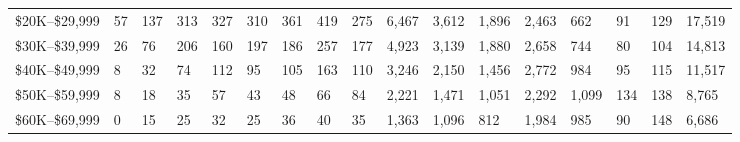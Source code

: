 \documentclass{article}
\begin{document}
\begin{landscape}
\begin{table}[h]
\begin{tabular}{|l|lllllllllllllll|l|}
\$20K--\$29,999 & 57                                         & 137                                 & 313                                & 327                                & 310                              & 361                               & 419                               & 275                               & 6,467                            & 3,612                                 & 1,896                            & 2,463                            & 662                              & 91                                  & 129          & 17,519  \\ \cline{1-1} \cline{17-17} 
\$30K--\$39,999 & 26                                         & 76                                  & 206                                & 160                                & 197                              & 186                               & 257                               & 177                               & 4,923                            & 3,139                                 & 1,880                            & 2,658                            & 744                              & 80                                  & 104          & 14,813  \\ \cline{1-1} \cline{17-17} 
\$40K--\$49,999 & 8                                          & 32                                  & 74                                 & 112                                & 95                               & 105                               & 163                               & 110                               & 3,246                            & 2,150                                 & 1,456                            & 2,772                            & 984                              & 95                                  & 115          & 11,517  \\ \cline{1-1} \cline{17-17} 
\$50K--\$59,999 & 8                                          & 18                                  & 35                                 & 57                                 & 43                               & 48                                & 66                                & 84                                & 2,221                            & 1,471                                 & 1,051                            & 2,292                            & 1,099                            & 134                                 & 138          & 8,765   \\ \cline{1-1} \cline{17-17} 
\$60K--\$69,999 & 0                                          & 15                                  & 25                                 & 32                                 & 25                               & 36                                & 40                                & 35                                & 1,363                            & 1,096                                 & 812                              & 1,984                            & 985                              & 90                                  & 148          & 6,686   \\ \cline{1-1} \cline{17-17} 

\end{tabular}
\end{table}
\end{landscape}
\end{document}
